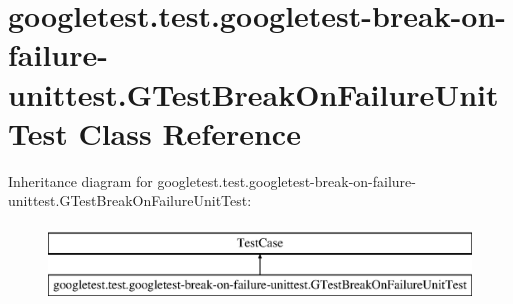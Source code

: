 \hypertarget{classgoogletest_1_1test_1_1googletest-break-on-failure-unittest_1_1_g_test_break_on_failure_unit_test}{}\section{googletest.\+test.\+googletest-\/break-\/on-\/failure-\/unittest.G\+Test\+Break\+On\+Failure\+Unit\+Test Class Reference}
\label{classgoogletest_1_1test_1_1googletest-break-on-failure-unittest_1_1_g_test_break_on_failure_unit_test}
Inheritance diagram for googletest.\+test.\+googletest-\/break-\/on-\/failure-\/unittest.G\+Test\+Break\+On\+Failure\+Unit\+Test\+:\begin{figure}[H]
\begin{center}
\leavevmode
\includegraphics[height=2.000000cm]{d8/df5/classgoogletest_1_1test_1_1googletest-break-on-failure-unittest_1_1_g_test_break_on_failure_unit_test}
\end{center}
\end{figure}
